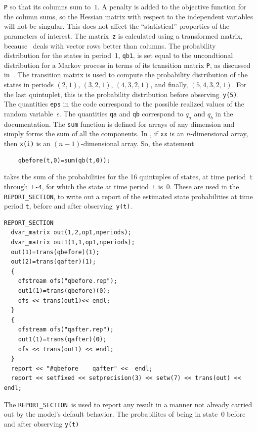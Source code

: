 \documentclass{admbmanual}
\newcommand\RS{\texttt{REPORT\_SECTION}}
\begin{document}
\texttt{P} so that its columns sum to~$1$. A penalty is added to
the objective function for the column sums, so the Hessian matrix 
with respect to the independent variables will not be singular. This does not affect
 the ``statistical'' properties of the parameters of interest.
The matrix~\texttt{z} is calculated using a transformed matrix, because
\ADM\ deals with vector rows better than columns.
The probability distribution for the states in period~1, \texttt{qb1},
is set equal to the uncondtional distribution for a Markov process
in terms of its transition matrix \texttt{P}, as discussed in~\cite{hamilton1994}.
The transition matrix is used to compute the probability distribution of the
states in periods $(2,1)$, $(3,2,1)$, $(4,3,2,1)$, and finally,
$(5,4,3,2,1)$. For the last quintuplet, this is the probability  
distribution before observing~\texttt{y(5)}. The quantities \texttt{eps}
in the code correspond to the possible 
realized values of the random variable~$\epsilon$. The quantities
\texttt{qa} and \texttt{qb} correspond to $q_a$ and $q_b$ in the documentation.
The \texttt{sum} function is defined for arrays of any dimension and simply
forms the sum of all the components. In \ADM, if \texttt{xx} is an $n$-dimensional
array, then \texttt{x(i)} is an $(n-1)$-dimensional array. So, the statement
\begin{lstlisting}
    qbefore(t,0)=sum(qb(t,0));
\end{lstlisting}
takes the sum of the probabilities for the 
16 quintuples of states, at time period~\texttt{t} through~\texttt{t-4},
for which the state at time period~\texttt{t} is~$0$. These are used in the
\RS, to write out a report of the estimated state probabilities at time
period \texttt{t}, before and after observing~\texttt{y(t)}.
\begin{lstlisting}
REPORT_SECTION
  dvar_matrix out(1,2,op1,nperiods);
  dvar_matrix out1(1,1,op1,nperiods);
  out(1)=trans(qbefore)(1);
  out(2)=trans(qafter)(1);
  {
    ofstream ofs("qbefore.rep");
    out1(1)=trans(qbefore)(0);
    ofs << trans(out1)<< endl;
  }  
  {
    ofstream ofs("qafter.rep");
    out1(1)=trans(qafter)(0);
    ofs << trans(out1) << endl;
  }  
  report << "#qbefore    qafter" <<  endl;
  report << setfixed << setprecision(3) << setw(7) << trans(out) << endl;
\end{lstlisting}
The \RS\ is used to report any result in a manner not already
carried out by the model's default behavior. The probabilites of
being in state~$0$ before and after observing \texttt{y(t)}
\end{document}
